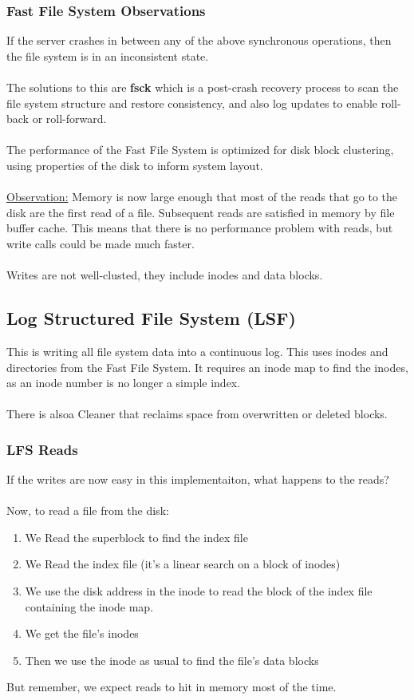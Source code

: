 \documentclass{article}
\begin{document}
\subsubsection{Fast File System Observations}

If the server crashes in between any of the above synchronous operations, then the file system is in an inconsistent state.
\\
\\
The solutions to this are \textbf{fsck} which is a post-crash recovery process to scan the file system structure and restore consistency, and also log updates to enable roll-back or roll-forward.
\\
\\
The performance of the Fast File System is optimized for disk block clustering, using properties of the disk to inform system layout.
\\
\\
\underline{Observation:} Memory is now large enough that most of the reads that go to the disk are the first read of a file. Subsequent reads are satisfied in memory by file buffer cache. This means that there is no performance problem with reads, but write calls could be made much faster.
\\
\\
Writes are not well-clusted, they include inodes and data blocks.

\subsection{Log Structured File System (LSF)}

This is writing all file system data into a continuous log. This uses inodes and directories from the Fast File System. It requires an inode map to find the inodes, as an inode number is no longer a simple index.
\\
\\
There is alsoa  Cleaner that reclaims space from overwritten or deleted blocks.

\subsubsection{LFS Reads}

If the writes are now easy in this implementaiton, what happens to the reads?
\\
\\
Now, to read a file from the disk:
\begin{enumerate}
    \item We Read the superblock to find the index file
    \item We Read the index file (it's a linear search on a block of inodes)
    \item We use the disk address in the inode to read the block of the index file containing the inode map.
    \item We get the file's inodes
    \item Then we use the inode as usual to find the file's data blocks
\end{enumerate}
But remember, we expect reads to hit in memory most of the time.
\end{document}

